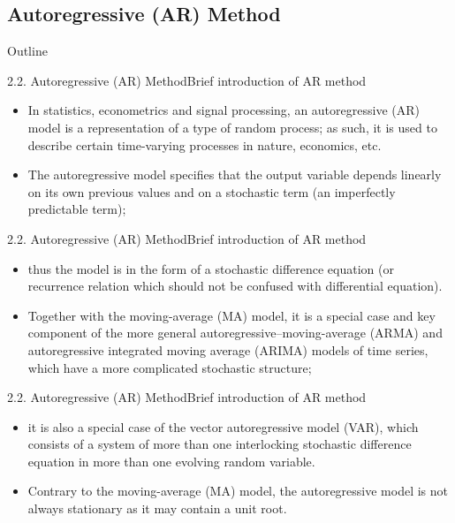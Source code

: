 \documentclass[12pt]{beamer}
\begin{document}
\subsection{Autoregressive (AR) Method}
\begin{frame}{Outline}
  \transfade%
  \tableofcontents[sectionstyle=show/shaded,subsectionstyle=show/shaded] %
\end{frame}
\begin{frame}{2.2. Autoregressive (AR) Method}{Brief introduction of AR method}
  \begin{itemize}
    \item In statistics, econometrics and signal processing, an autoregressive (AR) model is a representation of a type of random process; as such, it is used to describe certain time-varying processes in nature, economics, etc.
    \item The autoregressive model specifies that the output variable depends linearly on its own previous values and on a stochastic term (an imperfectly predictable term);
  \end{itemize}
      
\end{frame}
\begin{frame}{2.2. Autoregressive (AR) Method}{Brief introduction of AR method}
  \begin{itemize}
    \item thus the model is in the form of a stochastic difference equation (or recurrence relation which should not be confused with differential equation).
    \item Together with the moving-average (MA) model, it is a special case and key component of the more general autoregressive–moving-average (ARMA) and autoregressive integrated moving average (ARIMA) models of time series, which have a more complicated stochastic structure;
    
  \end{itemize}
\end{frame}
\begin{frame}{2.2. Autoregressive (AR) Method}{Brief introduction of AR method}
  \begin{itemize}
    \item it is also a special case of the vector autoregressive model (VAR), which consists of a system of more than one interlocking stochastic difference equation in more than one evolving random variable.
    \item Contrary to the moving-average (MA) model, the autoregressive model is not always stationary as it may contain a unit root.
  \end{itemize}
\end{frame}
\end{document}
